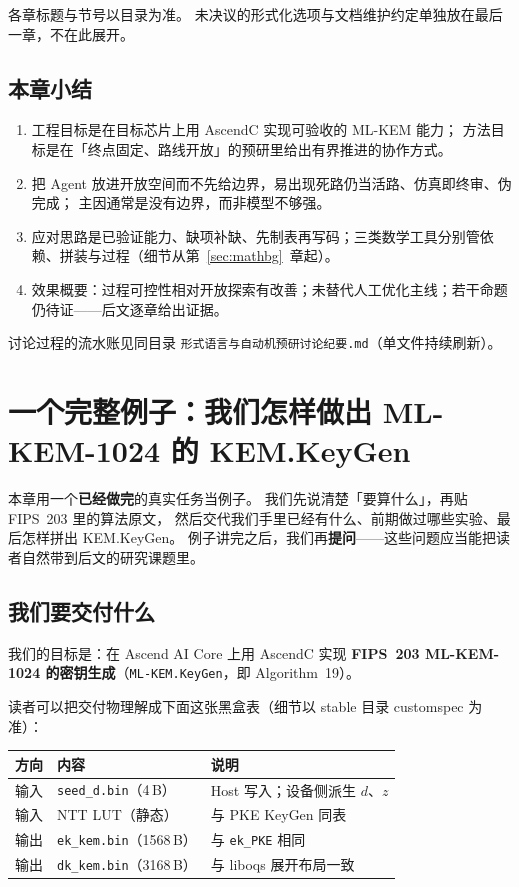 \documentclass[UTF8,a4paper,11pt]{ctexart}
\theoremstyle{definition}
\theoremstyle{plain}
\theoremstyle{remark}
\numberwithin{figure}{section}
\numberwithin{table}{section}
\begin{document}
\noindent 各章标题与节号以目录为准。
未决议的形式化选项与文档维护约定单独放在最后一章，不在此展开。

\subsection{本章小结}

\begin{enumerate}
  \item 工程目标是在目标芯片上用 AscendC 实现可验收的 ML-KEM 能力；
        方法目标是在「终点固定、路线开放」的预研里给出有界推进的协作方式。
  \item 把 Agent 放进开放空间而不先给边界，易出现死路仍当活路、仿真即终审、伪完成；
        主因通常是没有边界，而非模型不够强。
  \item 应对思路是已验证能力、缺项补缺、先制表再写码；三类数学工具分别管依赖、拼装与过程（细节从第~\ref{sec:mathbg}~章起）。
  \item 效果概要：过程可控性相对开放探索有改善；未替代人工优化主线；若干命题仍待证——后文逐章给出证据。
\end{enumerate}

讨论过程的流水账见同目录 \texttt{形式语言与自动机预研讨论纪要.md}（单文件持续刷新）。

\section{一个完整例子：我们怎样做出 ML-KEM-1024 的 KEM.KeyGen}
\label{sec:hook}

本章用一个\textbf{已经做完}的真实任务当例子。
我们先说清楚「要算什么」，再贴 FIPS~203 里的算法原文，
然后交代我们手里已经有什么、前期做过哪些实验、最后怎样拼出 KEM.KeyGen。
例子讲完之后，我们再\textbf{提问}——这些问题应当能把读者自然带到后文的研究课题里。

\subsection{我们要交付什么}

我们的目标是：在 Ascend AI Core 上用 AscendC 实现
\textbf{FIPS~203 ML-KEM-1024 的密钥生成}（\texttt{ML-KEM.KeyGen}，即 Algorithm~19）。

读者可以把交付物理解成下面这张黑盒表（细节以 stable 目录 customspec 为准）：

\begin{center}
\begin{tabular}{@{}lll@{}}
  \toprule
  方向 & 内容 & 说明 \\
  \midrule
  输入 & \texttt{seed\_d.bin}（4\,B） & Host 写入；设备侧派生 $d$、$z$ \\
  输入 & NTT LUT（静态） & 与 PKE KeyGen 同表 \\
  输出 & \texttt{ek\_kem.bin}（1568\,B） & 与 \texttt{ek\_PKE} 相同 \\
  输出 & \texttt{dk\_kem.bin}（3168\,B） & 与 liboqs 展开布局一致 \\
  \bottomrule
\end{tabular}
\end{center}
\end{document}
